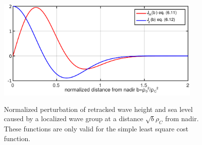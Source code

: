\begin{figure}[h!]
\centerline{\includegraphics[width=0.9\textwidth]{FIGS_CH_SAT/FigA3_Jfunc.pdf}}
  \caption{Normalized perturbation of retracked wave height and sea level caused by a localized wave group at a distance $\sqrt{b} \rho_C$ from nadir. These functions are only valid for the simple least square cost function.}{} \label{fig:alti_JLS}
\end{figure}


